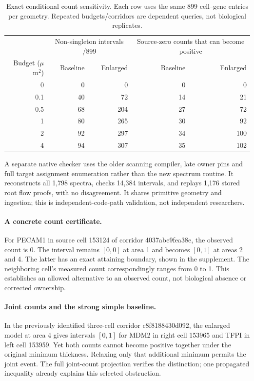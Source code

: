 \documentclass[10pt,letterpaper]{article}
\begin{document}
\begin{table}[!ht]
\centering
\begin{tabular}{r rr rr}
\toprule
&\multicolumn{2}{c}{Non-singleton intervals /899}&\multicolumn{2}{c}{Source-zero counts that can become positive}\\
Budget ($\mu$m$^2$)&Baseline&Enlarged&Baseline&Enlarged\\\midrule
0&0&0&0&0\\
0.1&40&72&14&21\\
0.5&68&204&27&72\\
1&80&265&30&92\\
2&92&297&34&100\\
4&94&307&35&102\\\bottomrule
\end{tabular}
\caption{Exact conditional count sensitivity. Each row uses the same 899 cell--gene entries per geometry. Repeated budgets/corridors are dependent queries, not biological replicates.}
\end{table}

A separate native checker uses the older scanning compiler, late owner pins and full target assignment enumeration rather than the new spectrum routine. It reconstructs all 1,798 spectra, checks 14,384 intervals, and replays 1,176 stored root flow proofs, with no disagreement. It shares primitive geometry and ingestion; this is independent-code-path validation, not independent researchers.

\paragraph{A concrete count certificate.}
For PECAM1 in source cell 153124 of corridor 4037abe9fea38e, the observed count is 0. The interval remains $[0,0]$ at area 1 and becomes $[0,1]$ at areas 2 and 4. The latter has an exact attaining boundary, shown in the supplement. The neighboring cell's measured count correspondingly ranges from 0 to 1. This establishes an allowed alternative to an observed count, not biological absence or corrected ownership.


\paragraph{Joint counts and the strong simple baseline.}
In the previously identified three-cell corridor c8f8188430d092, the enlarged model at area 4 gives intervals $[0,1]$ for MDM2 in right cell 153965 and TFPI in left cell 153959. Yet both counts cannot become positive together under the original minimum thickness. Relaxing only that additional minimum permits the joint event. The full joint-count projection verifies the distinction; one propagated inequality already explains this selected obstruction.
\end{document}
